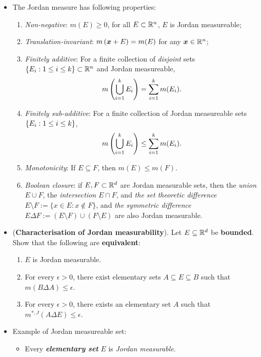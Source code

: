 \documentclass[11pt]{article}
\begin{document}
\begin{itemize}
\item The Jordan measure has following properties: 
\begin{enumerate}
\item \emph{Non-negative}: $m(E) \ge 0$, for all $E\subset {\mathbb R}^{n}$, $E$ is Jordan measureable;
\item \emph{Translation-invariant}: $m\left(\boldsymbol{x}+ E\right) = m(E)$ for any $\boldsymbol{x}\in {\mathbb R}^{n}$; 
\item \emph{Finitely additive}: For a finite collection of \emph{disjoint} sets $\left\{E_{i}: 1\le i\le k\right\} \subset {\mathbb R}^{n}$ and Jordan measureable,  
$$ m\left(\bigcup_{i=1}^{k}E_{i}\right)= \sum_{i=1}^{k}m(E_{i}).$$
\item \emph{Finitely sub-additive}: For a finite collection of Jordan measureable sets $\left\{E_{i}: 1\le i\le k\right\}$, 
$$ m\left(\bigcup_{i=1}^{k}E_{i}\right) \le  \sum_{i=1}^{k}m(E_{i}).$$
\item \emph{Monotonicity}:  If $E \subseteq F$, then $m(E) \le m(F)$.
\item \emph{Boolean closure}: if $E, F \subset {\mathbb R}^d$ are Jordan measurable sets, then the \emph{union} $E \cup F$, the \emph{intersection} $E \cap F$, and \emph{the set theoretic difference} $E \setminus F := \{x \in E : x \not\in F \}$, and \emph{the symmetric difference} $E \Delta F := ( E \setminus F ) \cup (F \setminus E)$ are also Jordan measurable.
\end{enumerate}

\item \begin{proposition} (\textbf{Characterisation of Jordan measurability}). \citep{tao2011introduction}
Let $E \subseteq {\mathbb R}^d$ be \textbf{bounded}. Show that the following are \textbf{equivalent}:
\begin{enumerate}
\item $E$ is Jordan measurable.
\item For every $\epsilon > 0$, there exist elementary sets $A \subseteq E \subseteq B$ such that $m(B \Delta A) \le  \epsilon$.
\item For every $\epsilon > 0$, there exists an elementary set $A$ such that $m^{*, J}(A \Delta E) \le \epsilon$.
\end{enumerate}
\end{proposition}

\item Example of Jordan measureable set:
\begin{itemize}
\item Every \emph{\textbf{elementary set}} $E$ is \emph{Jordan measurable}.


\end{itemize}
\end{itemize}
\end{document}
